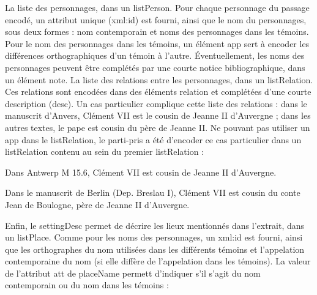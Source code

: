 \documentclass[12pt, a4paper]{article}
\begin{document}
                                 La liste des personnages, dans un listPerson. Pour chaque
                                    personnage du passage encodé, un attribut unique (xml:id) est fourni, ainsi que le
                                    nom du personnages, sous deux formes : nom contemporain et noms des personnages dans les témoins.
                                    Pour le nom des personnages dans les témoins, un élément app sert à encoder les différences
                                    orthographiques d'un témoin à l'autre. Éventuellement, les noms des personnages peuvent être complétés
                                    par une courte notice bibliographique, dans un élément note.
                                 La liste des relations entre les personnages, dans un listRelation. Ces relations
                                    sont encodées dans des éléments relation et complétées d'une courte description (desc). Un 
                                    cas particulier complique cette liste des relations : dans le manuscrit d'Anvers, Clément VII est le 
                                    cousin de Jeanne II d'Auvergne ; dans les autres textes, le pape est cousin du père de Jeanne II. 
                                    Ne pouvant pas utiliser un app dans le listRelation, le parti-pris a été d'encoder 
                                    ce cas particulier dans un listRelation contenu au sein du premier listRelation :
                                    
                                       
                                          
                                          
                                             
                                                Dans Antwerp M 15.6, Clément VII est cousin de Jeanne II d'Auvergne.
                                             
                                             
                                                Dans le manuscrit de Berlin (Dep. Breslau I), Clément VII est cousin du conte Jean de Boulogne, père de Jeanne II d'Auvergne.
                                             
                                          
                                       
                                    
                              
                           
                           Enfin, le settingDesc permet de décrire les lieux mentionnés dans l'extrait, dans un 
                              listPlace. Comme pour les noms des personnages, un xml:id est fourni, ainsi 
                              que les orthographes du nom utilisées dans les différents témoins et l'appelation contemporaine du nom 
                              (si elle diffère de l'appelation dans les témoins). La valeur 
                              de l'attribut att de placeName permett d'indiquer s'il s'agit du nom 
                              contemporain ou du nom dans les témoins :
                              
\end{document}
